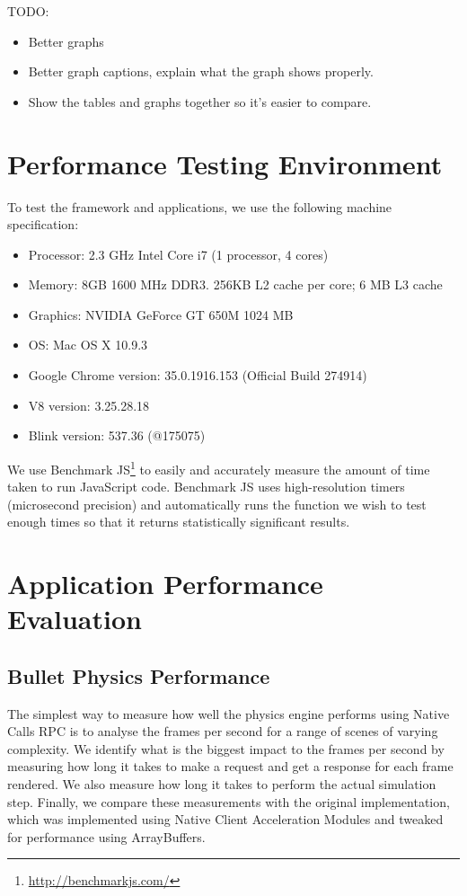 TODO:
\begin{itemize}
  \item Better graphs
  \item Better graph captions, explain what the graph shows properly.
  \item Show the tables and graphs together so it's easier to compare.
\end{itemize}
\section{Performance Testing Environment} %
\label{sec:performance_testing_environment}
To test the framework and applications, we use the following machine specification:
\begin{itemize}
  \item Processor: 2.3 GHz Intel Core i7 (1 processor, 4 cores)
  \item Memory: 8GB 1600 MHz DDR3. 256KB L2 cache per core; 6 MB L3 cache
  \item Graphics: NVIDIA GeForce GT 650M 1024 MB
  \item OS: Mac OS X 10.9.3
  \item Google Chrome version: 35.0.1916.153 (Official Build 274914) 
  \item V8 version: 3.25.28.18
  \item Blink version: 537.36 (@175075)
\end{itemize}

We use Benchmark JS\footnote{\url{http://benchmarkjs.com/}} to easily and accurately measure the amount of time taken to run JavaScript code. Benchmark JS uses high-resolution timers (microsecond precision) and automatically runs the function we wish to test enough times so that it returns statistically significant results. 

\section{Application Performance Evaluation} %
\label{sec:application_performance_evaluation}
\subsection{Bullet Physics Performance} %
\label{sub:bullet_physics_performance}
The simplest way to measure how well the physics engine performs using Native Calls RPC is to analyse the frames per second for a range of scenes of varying complexity. We identify what is the biggest impact to the frames per second by measuring how long it takes to make a request and get a response for each frame rendered. We also measure how long it takes to perform the actual simulation step. Finally, we compare these measurements with the original implementation, which was implemented using Native Client Acceleration Modules and tweaked for performance using ArrayBuffers.

